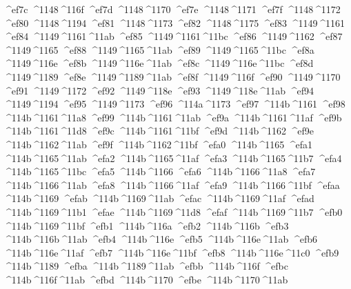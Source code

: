 \checkit ^^^^ef7c ^^^^1148^^^^116f
\checkit ^^^^ef7d ^^^^1148^^^^1170
\checkit ^^^^ef7e ^^^^1148^^^^1171
\checkit ^^^^ef7f ^^^^1148^^^^1172
\checkit ^^^^ef80 ^^^^1148^^^^1194
\checkit ^^^^ef81 ^^^^1148^^^^1173
\checkit ^^^^ef82 ^^^^1148^^^^1175
\checkit ^^^^ef83 ^^^^1149^^^^1161
\checkit ^^^^ef84 ^^^^1149^^^^1161^^^^11ab
\checkit ^^^^ef85 ^^^^1149^^^^1161^^^^11bc
\checkit ^^^^ef86 ^^^^1149^^^^1162
\checkit ^^^^ef87 ^^^^1149^^^^1165
\checkit ^^^^ef88 ^^^^1149^^^^1165^^^^11ab
\checkit ^^^^ef89 ^^^^1149^^^^1165^^^^11bc
\checkit ^^^^ef8a ^^^^1149^^^^116e
\checkit ^^^^ef8b ^^^^1149^^^^116e^^^^11ab
\checkit ^^^^ef8c ^^^^1149^^^^116e^^^^11bc
\checkit ^^^^ef8d ^^^^1149^^^^1189
\checkit ^^^^ef8e ^^^^1149^^^^1189^^^^11ab
\checkit ^^^^ef8f ^^^^1149^^^^116f
\checkit ^^^^ef90 ^^^^1149^^^^1170
\checkit ^^^^ef91 ^^^^1149^^^^1172
\checkit ^^^^ef92 ^^^^1149^^^^118e
\checkit ^^^^ef93 ^^^^1149^^^^118e^^^^11ab
\checkit ^^^^ef94 ^^^^1149^^^^1194
\checkit ^^^^ef95 ^^^^1149^^^^1173
\checkit ^^^^ef96 ^^^^114a^^^^1173
\checkit ^^^^ef97 ^^^^114b^^^^1161
\checkit ^^^^ef98 ^^^^114b^^^^1161^^^^11a8
\checkit ^^^^ef99 ^^^^114b^^^^1161^^^^11ab
\checkit ^^^^ef9a ^^^^114b^^^^1161^^^^11af
\checkit ^^^^ef9b ^^^^114b^^^^1161^^^^11d8
\checkit ^^^^ef9c ^^^^114b^^^^1161^^^^11bf
\checkit ^^^^ef9d ^^^^114b^^^^1162
\checkit ^^^^ef9e ^^^^114b^^^^1162^^^^11ab
\checkit ^^^^ef9f ^^^^114b^^^^1162^^^^11bf
\checkit ^^^^efa0 ^^^^114b^^^^1165
\checkit ^^^^efa1 ^^^^114b^^^^1165^^^^11ab
\checkit ^^^^efa2 ^^^^114b^^^^1165^^^^11af
\checkit ^^^^efa3 ^^^^114b^^^^1165^^^^11b7
\checkit ^^^^efa4 ^^^^114b^^^^1165^^^^11bc
\checkit ^^^^efa5 ^^^^114b^^^^1166
\checkit ^^^^efa6 ^^^^114b^^^^1166^^^^11a8
\checkit ^^^^efa7 ^^^^114b^^^^1166^^^^11ab
\checkit ^^^^efa8 ^^^^114b^^^^1166^^^^11af
\checkit ^^^^efa9 ^^^^114b^^^^1166^^^^11bf
\checkit ^^^^efaa ^^^^114b^^^^1169
\checkit ^^^^efab ^^^^114b^^^^1169^^^^11ab
\checkit ^^^^efac ^^^^114b^^^^1169^^^^11af
\checkit ^^^^efad ^^^^114b^^^^1169^^^^11b1
\checkit ^^^^efae ^^^^114b^^^^1169^^^^11d8
\checkit ^^^^efaf ^^^^114b^^^^1169^^^^11b7
\checkit ^^^^efb0 ^^^^114b^^^^1169^^^^11bf
\checkit ^^^^efb1 ^^^^114b^^^^116a
\checkit ^^^^efb2 ^^^^114b^^^^116b
\checkit ^^^^efb3 ^^^^114b^^^^116b^^^^11ab
\checkit ^^^^efb4 ^^^^114b^^^^116e
\checkit ^^^^efb5 ^^^^114b^^^^116e^^^^11ab
\checkit ^^^^efb6 ^^^^114b^^^^116e^^^^11af
\checkit ^^^^efb7 ^^^^114b^^^^116e^^^^11bf
\checkit ^^^^efb8 ^^^^114b^^^^116e^^^^11c0
\checkit ^^^^efb9 ^^^^114b^^^^1189
\checkit ^^^^efba ^^^^114b^^^^1189^^^^11ab
\checkit ^^^^efbb ^^^^114b^^^^116f
\checkit ^^^^efbc ^^^^114b^^^^116f^^^^11ab
\checkit ^^^^efbd ^^^^114b^^^^1170
\checkit ^^^^efbe ^^^^114b^^^^1170^^^^11ab
